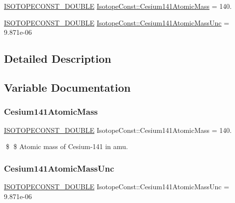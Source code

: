 \begin{DoxyCompactItemize}
\item 
\mbox{\hyperlink{group___isotope_const-_macros_ga8f45a7272ce02c0b4c65c44636ed719a}{I\+S\+O\+T\+O\+P\+E\+C\+O\+N\+S\+T\+\_\+\+D\+O\+U\+B\+LE}} \mbox{\hyperlink{group___isotope_const-_cesium-_cs141_gaa9a52d1d76e6bc3348b9de575e5762ab}{Isotope\+Const\+::\+Cesium141\+Atomic\+Mass}} = 140.
\item 
\mbox{\hyperlink{group___isotope_const-_macros_ga8f45a7272ce02c0b4c65c44636ed719a}{I\+S\+O\+T\+O\+P\+E\+C\+O\+N\+S\+T\+\_\+\+D\+O\+U\+B\+LE}} \mbox{\hyperlink{group___isotope_const-_cesium-_cs141_ga63ce0a654f4a5dbd01990b029785a6a9}{Isotope\+Const\+::\+Cesium141\+Atomic\+Mass\+Unc}} = 9.\+871e-\/06
\end{DoxyCompactItemize}


\subsection{Detailed Description}


\subsection{Variable Documentation}
\mbox{\label{group___isotope_const-_cesium-_cs141_gaa9a52d1d76e6bc3348b9de575e5762ab}} 
\subsubsection{\texorpdfstring{Cesium141\+Atomic\+Mass}{Cesium141AtomicMass}}
{\footnotesize\ttfamily \mbox{\hyperlink{group___isotope_const-_macros_ga8f45a7272ce02c0b4c65c44636ed719a}{I\+S\+O\+T\+O\+P\+E\+C\+O\+N\+S\+T\+\_\+\+D\+O\+U\+B\+LE}} Isotope\+Const\+::\+Cesium141\+Atomic\+Mass = 140.}

\$ \$ Atomic mass of Cesium-\/141 in amu. \mbox{\label{group___isotope_const-_cesium-_cs141_ga63ce0a654f4a5dbd01990b029785a6a9}} 
\subsubsection{\texorpdfstring{Cesium141\+Atomic\+Mass\+Unc}{Cesium141AtomicMassUnc}}
{\footnotesize\ttfamily \mbox{\hyperlink{group___isotope_const-_macros_ga8f45a7272ce02c0b4c65c44636ed719a}{I\+S\+O\+T\+O\+P\+E\+C\+O\+N\+S\+T\+\_\+\+D\+O\+U\+B\+LE}} Isotope\+Const\+::\+Cesium141\+Atomic\+Mass\+Unc = 9.\+871e-\/06}

